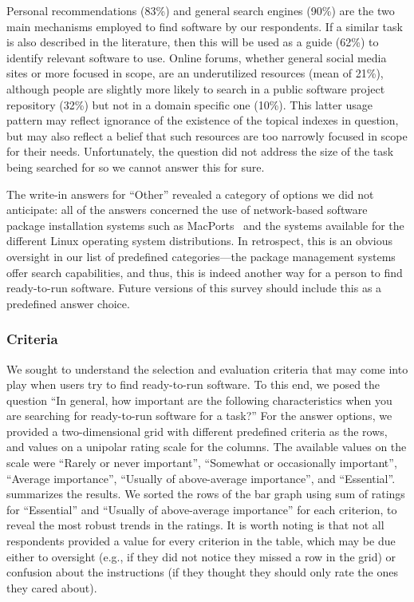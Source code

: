 \documentclass{casicswhitepaper}
\begin{document}
Personal recommendations (83\%) and general search engines (90\%) are the two main mechanisms employed to find software by our respondents. If a similar task is also described in the literature, then this will be used as a guide (62\%) to identify relevant software to use. Online forums, whether general social media sites or more focused in scope, are an underutilized resources (mean of 21\%), although people are slightly more likely to search in a public software project repository (32\%) but not in a domain specific one (10\%). This latter usage pattern may reflect ignorance of the existence of the topical indexes in question, but may also reflect a belief that such resources are too narrowly focused in scope for their needs. Unfortunately, the question did not address the size of the task being searched for so we cannot answer this for sure.

The write-in answers for ``Other'' revealed a category of options we did not anticipate: all of the answers concerned the use of network-based software package installation systems such as MacPorts~\cite{fuller2002macports} and the systems available for the different Linux operating system distributions.  In retrospect, this is an obvious oversight in our list of predefined categories---the package management systems offer search capabilities, and thus, this is indeed another way for a person to find ready-to-run software.  Future versions of this survey should include this as a predefined answer choice.


\subsubsection{Criteria}

We sought to understand the selection and evaluation criteria that may come into play when users try to find ready-to-run software.  To this end, we posed the question ``In general, how important are the following characteristics when you are searching for ready-to-run software for a task?''  For the answer options, we provided a two-dimensional grid with different predefined criteria as the rows, and values on a unipolar rating scale for the columns.  The available values on the scale were ``Rarely or never important'', ``Somewhat or occasionally important'', ``Average importance'', ``Usually of above-average importance'', and ``Essential''.  summarizes the results.  We sorted the rows of the bar graph using sum of ratings for ``Essential'' and ``Usually of above-average importance'' for each criterion, to reveal the most robust trends in the ratings.  It is worth noting is that not all respondents provided a value for every criterion in the table, which may be due either to oversight (e.g., if they did not notice they missed a row in the grid) or confusion about the instructions (if they thought they should only rate the ones they cared about).
\end{document}
